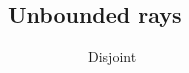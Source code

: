 \documentclass[11pt,a4paper,english]{article}
\begin{document}
	\subsection{Unbounded rays}
	\begin{figure}[h]
	\begin{subfigure}[b]{0.3\textwidth}
    	\caption{Disjoint \label{fig:two_unbounded_rays}}
	\end{subfigure}
	\qquad
	\begin{subfigure}[b]{0.3\textwidth}

\end{subfigure}
\end{figure}
\end{document}
